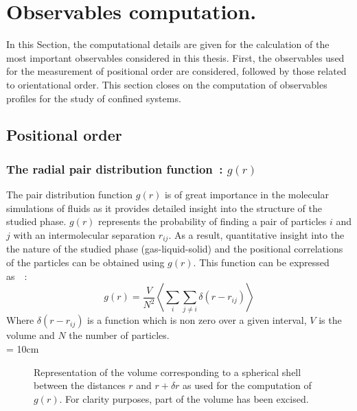 

\section{Observables computation.}


In this Section, the computational details are given for the calculation of the most important
observables considered in this thesis. First, the observables used for the measurement of positional 
order are considered, followed by those related to orientational order. This section closes on the
computation of observables profiles for the study of confined systems.

\subsection{Positional order}


\subsubsection{The radial pair distribution function~: $g(r)$}


The pair distribution function $g(r)$ is of great importance in the molecular simulations of
fluids as it provides detailed insight into the structure of the
studied phase. $g(r)$ represents the probability of finding a pair of particles $i$ and $j$ with
an intermolecular separation $r_{ij}$.  As a result, quantitative insight into the the nature 
of the studied phase (gas-liquid-solid) and the  positional correlations of the particles
can be obtained using $g(r)$. This function can be expressed as~\cite{AandT}~:
\begin{equation}
        g(r) = \frac{V}{N^2} \left< \sum_{i}\sum_{j\neq i} \delta(r - r_{ij}) \right>
\end{equation}
%
Where $\delta(r-r_{ij})$ is a function which is non zero over a given interval, $V$ is the volume and 
$N$ the number of particles.\\

\picW = 10cm
\begin{figure}
	\centering
	\caption{Representation of the volume corresponding to a spherical shell between the
	distances $r$ and $r+\delta r$ as used for the computation of $g(r)$. For clarity
	purposes, part of the volume has been excised.}
	\label{fig:g(r)SphericalShells}
\end{figure}

